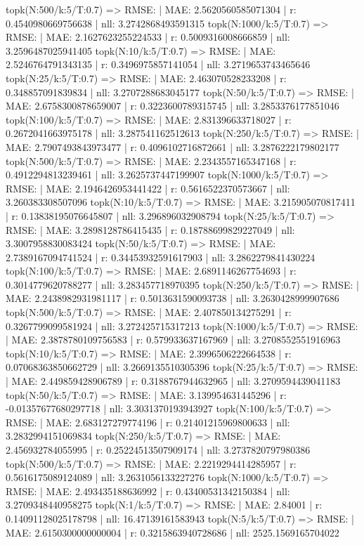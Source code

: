topk(N:500/k:5/T:0.7) => RMSE: | MAE: 2.5620560585071304 | r: 0.4540980669756638 | nll: 3.2742868493591315
topk(N:1000/k:5/T:0.7) => RMSE: | MAE: 2.1627623255224533 | r: 0.5009316008666859 | nll: 3.2596487025941405
topk(N:10/k:5/T:0.7) => RMSE: | MAE: 2.5246764791343135 | r: 0.3496975857141054 | nll: 3.2719653743465646
topk(N:25/k:5/T:0.7) => RMSE: | MAE: 2.463070528233208 | r: 0.348857091839834 | nll: 3.2707288683045177
topk(N:50/k:5/T:0.7) => RMSE: | MAE: 2.6758300878659007 | r: 0.3223600789315745 | nll: 3.2853376177851046
topk(N:100/k:5/T:0.7) => RMSE: | MAE: 2.831396633718027 | r: 0.2672041663975178 | nll: 3.287541162512613
topk(N:250/k:5/T:0.7) => RMSE: | MAE: 2.7907493843973477 | r: 0.4096102716872661 | nll: 3.2876222179802177
topk(N:500/k:5/T:0.7) => RMSE: | MAE: 2.2343557165347168 | r: 0.4912294813239461 | nll: 3.2625737447199907
topk(N:1000/k:5/T:0.7) => RMSE: | MAE: 2.1946426953441422 | r: 0.5616522370573667 | nll: 3.260383308507096
topk(N:10/k:5/T:0.7) => RMSE: | MAE: 3.215905070817411 | r: 0.13838195076645807 | nll: 3.296896032908794
topk(N:25/k:5/T:0.7) => RMSE: | MAE: 3.2898128786415435 | r: 0.18788699829227049 | nll: 3.3007958830083424
topk(N:50/k:5/T:0.7) => RMSE: | MAE: 2.7389167094741524 | r: 0.34453932591617903 | nll: 3.2862279841430224
topk(N:100/k:5/T:0.7) => RMSE: | MAE: 2.6891146267754693 | r: 0.3014779620788277 | nll: 3.283457718970395
topk(N:250/k:5/T:0.7) => RMSE: | MAE: 2.2438982931981117 | r: 0.5013631590093738 | nll: 3.2630428999907686
topk(N:500/k:5/T:0.7) => RMSE: | MAE: 2.407850134275291 | r: 0.3267799099581924 | nll: 3.272425715317213
topk(N:1000/k:5/T:0.7) => RMSE: | MAE: 2.3878780109756583 | r: 0.579933637167969 | nll: 3.2708552551916963
topk(N:10/k:5/T:0.7) => RMSE: | MAE: 2.3996506222664538 | r: 0.07068363850662729 | nll: 3.2669135510305396
topk(N:25/k:5/T:0.7) => RMSE: | MAE: 2.449859428906789 | r: 0.3188767944632965 | nll: 3.2709594439041183
topk(N:50/k:5/T:0.7) => RMSE: | MAE: 3.139954631445296 | r: -0.01357677680297718 | nll: 3.3031370193943927
topk(N:100/k:5/T:0.7) => RMSE: | MAE: 2.683127279774196 | r: 0.21401215969800633 | nll: 3.2832994151069834
topk(N:250/k:5/T:0.7) => RMSE: | MAE: 2.456932784055995 | r: 0.25224513507909174 | nll: 3.2737820797980386
topk(N:500/k:5/T:0.7) => RMSE: | MAE: 2.2219294414285957 | r: 0.5616175089124089 | nll: 3.2631056133227276
topk(N:1000/k:5/T:0.7) => RMSE: | MAE: 2.493435188636992 | r: 0.43400531342150384 | nll: 3.2709348440958275
topk(N:1/k:5/T:0.7) => RMSE: | MAE: 2.84001 | r: 0.14091128025178798 | nll: 16.47139161583943
topk(N:5/k:5/T:0.7) => RMSE: | MAE: 2.6150300000000004 | r: 0.3215863940728686 | nll: 2525.1569165704022
